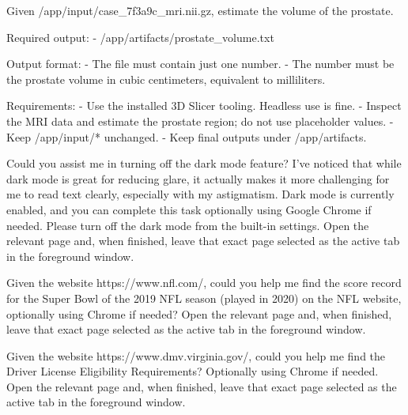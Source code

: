 \documentclass{llmxive}
\begin{document}
\begin{instructionbox}
Given \textasciigrave{}/app/input/case\_7f3a9c\_mri.nii.gz\textasciigrave{}, estimate the volume of the prostate.

Required output:
- \textasciigrave{}/app/artifacts/prostate\_volume.txt\textasciigrave{}

Output format:
- The file must contain just one number.
- The number must be the prostate volume in cubic centimeters, equivalent to milliliters.

Requirements:
- Use the installed 3D Slicer tooling. Headless use is fine.
- Inspect the MRI data and estimate the prostate region; do not use placeholder values.
- Keep \textasciigrave{}/app/input/*\textasciigrave{} unchanged.
- Keep final outputs under \textasciigrave{}/app/artifacts\textasciigrave{}.
\end{instructionbox}

\begin{instructionbox}
Could you assist me in turning off the dark mode feature? I've noticed that while dark mode is great for reducing glare, it actually makes it more challenging for me to read text clearly, especially with my astigmatism. Dark mode is currently enabled, and you can complete this task optionally using Google Chrome if needed. Please turn off the dark mode from the built-in settings. Open the relevant page and, when finished, leave that exact page selected as the active tab in the foreground window.
\end{instructionbox}

\begin{instructionbox}
Given the website \textasciigrave{}https://www.nfl.com/\textasciigrave{}, could you help me find the score record for the Super Bowl of the 2019 NFL season (played in 2020) on the NFL website, optionally using Chrome if needed? Open the relevant page and, when finished, leave that exact page selected as the active tab in the foreground window.
\end{instructionbox}

\begin{instructionbox}
Given the website \textasciigrave{}https://www.dmv.virginia.gov/\textasciigrave{}, could you help me find the Driver License Eligibility Requirements? Optionally using Chrome if needed. Open the relevant page and, when finished, leave that exact page selected as the active tab in the foreground window.
\end{instructionbox}
\end{document}

